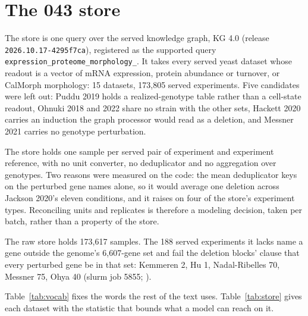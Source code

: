 
\section{The 043 store}
\label{sec:store}

The store is one query over the served knowledge graph, KG 4.0 (release
\texttt{2026.10.17-4295f7ca}), registered as the supported query
\texttt{expression\_\allowbreak proteome\_\allowbreak morphology\_}.
It takes every served yeast dataset whose readout is a vector of mRNA expression, protein
abundance or turnover, or CalMorph morphology: 15 datasets, 173{,}805 served experiments.
Five candidates were left out: Puddu 2019 holds a realized-genotype table rather than a
cell-state readout, Ohnuki 2018 and 2022 share no strain with the other sets, Hackett
2020 carries an induction the graph processor would read as a deletion, and Messner 2021
carries no genotype perturbation.

The store holds one sample per served pair of experiment and experiment reference, with
no unit converter, no deduplicator and no aggregation over genotypes. Two reasons were
measured on the code: the mean deduplicator keys on the perturbed gene names alone, so it
would average one deletion across Jackson 2020's eleven conditions, and it raises on four
of the store's experiment types. Reconciling units and replicates is therefore a modeling
decision, taken per batch, rather than a property of the store.

The raw store holds 173{,}617 samples. The 188 served experiments it lacks name a gene
outside the genome's 6{,}607-gene set and fail the deletion blocks' clause that every
perturbed gene be in that set: Kemmeren 2, Hu 1, Nadal-Ribelles 70, Messner 75, Ohya 40
(slurm job 5855; ).

Table~\ref{tab:vocab} fixes the words the rest of the text uses. Table~\ref{tab:store}
gives each dataset with the statistic that bounds what a model can reach on it.

